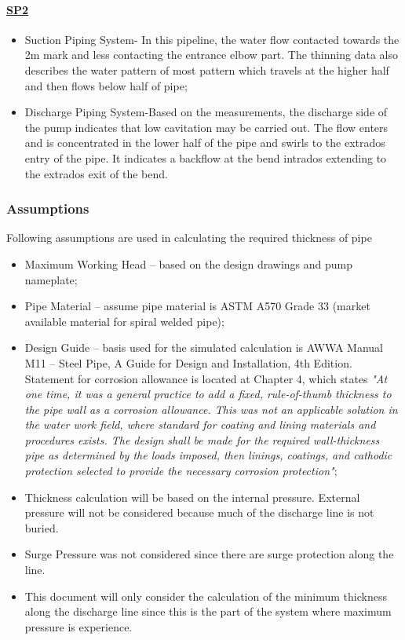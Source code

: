 \paragraph{\underline{SP2}}
\begin{itemize}
	\item Suction Piping System- In this pipeline, the water flow contacted towards the 2m mark and less contacting the entrance elbow part. The thinning data also describes the water pattern of most pattern which travels at the higher half and then flows below half of pipe;
	
	\item Discharge Piping System-Based on the measurements, the discharge side of the pump indicates that low cavitation may be carried out. The flow enters and is concentrated in the lower half of the pipe and swirls to the extrados entry of the pipe. It indicates a backflow at the bend intrados extending to the extrados exit of the bend.

\end{itemize}



\subsubsection{Assumptions}
Following assumptions are used in calculating the required thickness of pipe
\begin{itemize}
\item Maximum Working Head – based on the design drawings and pump nameplate;
\item Pipe Material – assume pipe material is ASTM A570 Grade 33 (market available material for spiral welded pipe);
\item Design Guide – basis used for the simulated calculation is AWWA  Manual M11 – Steel Pipe, A Guide for Design and Installation, 4th Edition. Statement for corrosion allowance is located at Chapter 4, which states \textit{"At one time, it was a general practice to add a fixed, rule-of-thumb thickness to the pipe wall as a corrosion allowance. This was not an applicable solution in the water work field, where standard for coating and lining materials and procedures exists. The design shall be made for the required wall-thickness pipe as determined by the loads imposed, then linings, coatings, and cathodic protection selected to provide the necessary corrosion protection"};
\item Thickness calculation will be based on the internal pressure. External pressure will not be considered because much of the discharge line is not buried.
\item 	Surge Pressure was not considered since there are surge protection along the line. 
\item 	This document will only consider the calculation of the minimum thickness along the discharge line since this is the part of the system where maximum pressure is experience.
\end{itemize}
